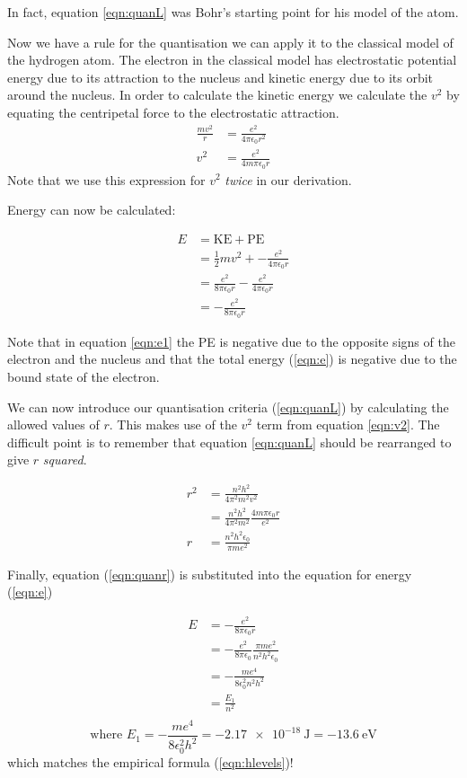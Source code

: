\documentclass[main.tex]{subfiles}
\begin{document}
In fact, equation \ref{eqn:quanL} was Bohr's starting point for his model of the atom.

Now we have a rule for the quantisation we can apply it to the classical model of the hydrogen atom. The electron in the classical model has electrostatic potential energy due to its attraction to the nucleus and kinetic energy due to its orbit around the nucleus. In order to calculate the kinetic energy we calculate the $v^2$ by equating the centripetal force to the electrostatic attraction.
\begin{align}
\frac{mv^2}{r} &= \frac{e^2}{4\pi\epsilon_0 r^2} \nonumber \\
v^2 &= \frac{e^2}{4m\pi\epsilon_0 r}\label{eqn:v2}
\end{align}
Note that we use this expression for $v^2$ \emph{twice} in our derivation.

Energy can now be calculated:

\begin{align}
  E &= \text{KE} + \text{PE}\nonumber \\
  &= \frac{1}{2}mv^2 + -\frac{e^2}{4\pi\epsilon_0 r}\label{eqn:e1}\\
  &= \frac{e^2}{8\pi\epsilon_0 r} - \frac{e^2}{4\pi\epsilon_0 r} \nonumber \\
  &= -\frac{e^2}{8\pi\epsilon_0 r}\label{eqn:e}
\end{align}

Note that in equation \ref{eqn:e1} the PE is negative due to the opposite signs of the electron and the nucleus and that the total energy (\ref{eqn:e}) is negative due to the bound state of the electron.

We can now introduce our quantisation criteria (\ref{eqn:quanL}) by calculating the allowed values of $r$. This makes use of the $v^2$ term from equation \ref{eqn:v2}. The difficult point is to remember that equation \ref{eqn:quanL} should be rearranged to give $r$ \emph{squared}.

\begin{align}
  r^2 &= \frac{n^2 h^2}{4\pi^2 m^2 v^2}\\
  &= \frac{n^2 h^2}{4\pi^2 m^2} \frac{4m\pi\epsilon_0 r}{e^2}\\
  r &= \frac{n^2h^2\epsilon_0}{\pi m e^2} \label{eqn:quanr}
\end{align}

Finally, equation (\ref{eqn:quanr}) is substituted into the equation for energy (\ref{eqn:e})

\begin{align*}
  E &= -\frac{e^2}{8\pi\epsilon_0 r}\\
  &=  -\frac{e^2}{8\pi\epsilon_0} \frac{\pi m e^2}{n^2h^2\epsilon_0} \\
  &= - \frac{me^4}{8\epsilon_0^2 n^2 h^2}\\
  &= \frac{E_1}{n^2}\\
\end{align*}
\[   \text{where } E_1 = -\frac{me^4}{8\epsilon_0^2 h^2} = \SI{-2.17e-18}{\joule} = \SI{-13.6}{\electronvolt} \]
which matches the empirical formula (\ref{eqn:hlevels})!
\end{document}
